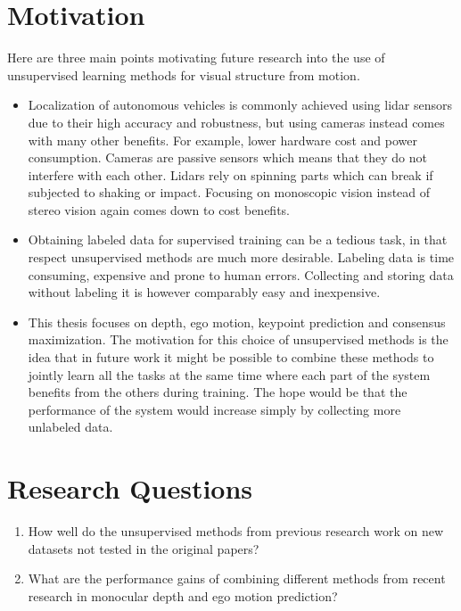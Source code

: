 \section{Motivation}

Here are three main points motivating future research into the use of unsupervised learning methods for visual structure from motion.


\begin{itemize}
	\item Localization of autonomous vehicles is commonly  achieved using lidar sensors due to their high accuracy and robustness, but using cameras instead comes with many other benefits\cite{lidarvscamera}. For example, lower hardware cost and power consumption. Cameras are passive sensors which means that they do not interfere with each other. Lidars rely on spinning parts which can break if subjected to shaking or impact. Focusing on monoscopic vision instead of stereo vision again comes down to cost benefits.
	
	\item Obtaining labeled data for supervised training can be a tedious task, in that respect unsupervised methods are much more desirable. Labeling data is time consuming, expensive and prone to human errors. Collecting and storing data without labeling it is however comparably easy and inexpensive.
	
	\item This thesis focuses on depth, ego motion, keypoint prediction and consensus maximization. The motivation for this choice of unsupervised methods is the idea that in future work it might be possible to combine these methods to jointly learn all the tasks at the same time where each part of the system benefits from the others during training. The hope would be that the performance of the system would increase simply by collecting more unlabeled data.
\end{itemize}

\section{Research Questions}

\begin{enumerate}
	
	\item How well do the unsupervised methods from previous research work on new datasets not tested in the original papers?
	
	\item What are the performance gains of combining different methods from recent research in monocular depth and ego motion prediction?
	
\end{enumerate}


